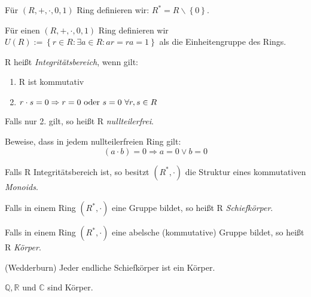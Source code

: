 \documentclass[10pt]{scrbook}
\begin{document}
\begin{Def}
Für $(R, +, \cdot, 0, 1)$ Ring definieren wir: $R^*=R\backslash\left\{0\right\}$.
\end{Def}

\begin{Def}
Für einen $(R, +, \cdot, 0, 1)$ Ring definieren wir $U(R):=\left\{r\in R: \exists a\in R: a r=r a=1\right\}$ als die Einheitengruppe des Rings.
\end{Def}

\begin{Def}
R heißt \emph{Integritätsbereich}, wenn gilt:
\begin{enumerate}
	\item R ist kommutativ
	\item $r\cdot s=0 \Rightarrow r=0\textnormal{ oder }s=0\ \forall r,s\in R$
\end{enumerate}
\end{Def}

\begin{Bem}Falls nur 2. gilt, so heißt R \emph{nullteilerfrei}.\end{Bem}

\begin{Auf}
Beweise, dass in jedem nullteilerfreien Ring gilt:
\begin{displaymath}
(a\cdot b)=0 \Rightarrow a=0 \vee b=0
\end{displaymath}
\end{Auf}

\begin{Bem}
Falls R Integritätsbereich ist, so besitzt $(R^*, \cdot)$ die Struktur eines kommutativen \emph{Monoids}.
\end{Bem}

\begin{Def}
Falls in einem Ring $(R^*, \cdot)$ eine Gruppe bildet, so heißt R \emph{Schiefkörper}.
\end{Def}

\begin{Def}
Falls in einem Ring $(R^*, \cdot)$ eine abelsche (kommutative) Gruppe bildet, so heißt R \emph{Körper}.
\end{Def}

\begin{Sa} (Wedderburn)
Jeder endliche Schiefkörper ist ein Körper.
\end{Sa}

\begin{Bsp}
$\mathbb{Q}, \mathbb{R}$ und $\mathbb{C}$ sind Körper.
\end{Bsp}
\end{document}
